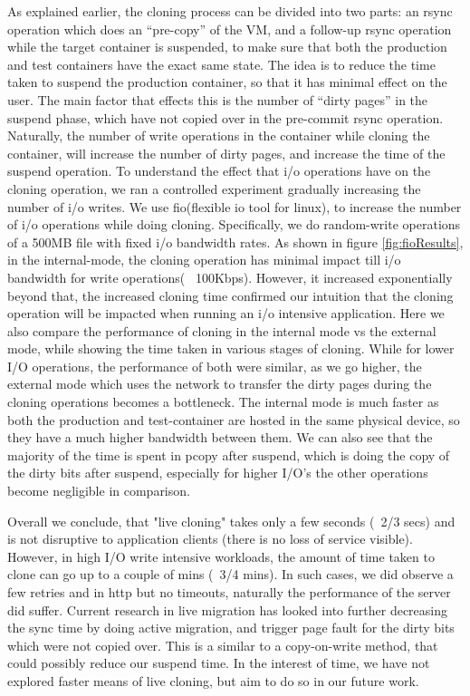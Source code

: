 As explained earlier, the cloning process can be divided into two parts: an rsync operation which does an ``pre-copy'' of the VM, and a follow-up rsync operation while the target container is suspended, to make sure that both the production and test containers have the exact same state.
The idea is to reduce the time taken to suspend the production container, so that it has minimal effect on the user.
The main factor that effects this is the number of ``dirty pages'' in the suspend phase, which have not copied over in the pre-commit rsync operation.
Naturally, the number of write operations in the container while cloning the container, will increase the number of dirty pages, and increase the time of the suspend operation.
To understand the effect that i/o operations have on the cloning operation, we ran a controlled experiment gradually increasing the number of i/o writes. 
We use fio(flexible io tool for linux)\cite{fio}, to increase the number of i/o operations while doing cloning. 
Specifically, we do random-write operations of a 500MB file with fixed i/o bandwidth rates.
As shown in figure \ref{fig:fioResults}, in the internal-mode, the cloning operation has minimal impact till i/o bandwidth for write operations(~ 100Kbps). 
However, it increased exponentially beyond that, the increased cloning time confirmed our intuition that the cloning operation will be impacted when running an i/o intensive application.
Here we also compare the performance of cloning in the internal mode vs the external mode, while showing the time taken in various stages of cloning.
While for lower I/O operations, the performance of both were similar, as we go higher, the external mode which uses the network to transfer the dirty pages during the cloning operations becomes a bottleneck. 
The internal mode is much faster as both the production and test-container are hosted in the same physical device, so they have a much higher bandwidth between them.
We can also see that the majority of the time is spent in pcopy after suspend, which is doing the copy of the dirty bits after suspend, especially for higher I/O's the other operations become negligible in comparison.

Overall we conclude, that "live cloning" takes only a few seconds (~2/3 secs) and is not disruptive to application clients (there is no loss of service visible). 
However, in high I/O write intensive workloads, the amount of time taken to clone can go up to a couple of mins (~3/4 mins).
In such cases, we did observe a few retries and in http but no timeouts, naturally the performance of the server did suffer. 
Current research in live migration has looked into further decreasing the sync time by doing active migration, and trigger page fault for the dirty bits which were not copied over.
This is a similar to a copy-on-write method, that could possibly reduce our suspend time.
In the interest of time, we have not explored faster means of live cloning, but aim to do so in our future work.

